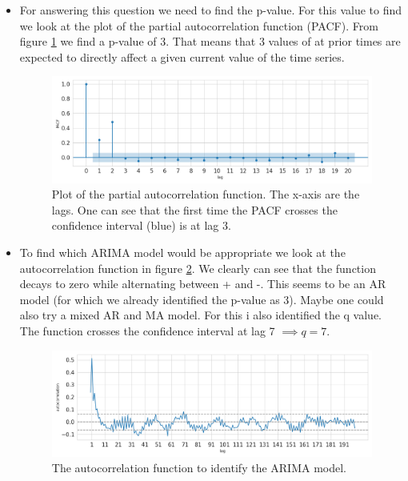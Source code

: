 \documentclass[]{article}
\begin{document}
\begin{itemize}
		\item For answering this question we need to find the p-value. For this value to find we look at the plot of the partial autocorrelation function (PACF). From figure \ref{fig:pacf} we find a p-value of 3. That means that 3 values of at prior times are expected to directly affect a given current value of the time series.
		\begin{figure}
			\centering
			\includegraphics[width=1\textwidth]{images/partialautocorrelation.png}
			\caption{Plot of the partial autocorrelation function. The x-axis are the lags. One can see that the first time the PACF crosses the confidence interval (blue) is at lag 3.}
			\label{fig:pacf}
		\end{figure}
		\item To find which ARIMA model would be appropriate we look at the autocorrelation function in figure \ref{fig:acf}. We clearly can see that the function decays to zero while alternating between + and -. This seems to be an AR model (for which we already identified the p-value as 3). Maybe one could also try a mixed AR and MA model. For this i also identified the q value. The function crosses the confidence interval at lag 7 $\implies q=7$. 
		\begin{figure}
			\centering
			\includegraphics[width=1\textwidth]{images/autocorrelation_identification.png}
			\caption{The autocorrelation function to identify the ARIMA model.}
			\label{fig:acf}
		\end{figure}
	\end{itemize}
	
\end{document}
